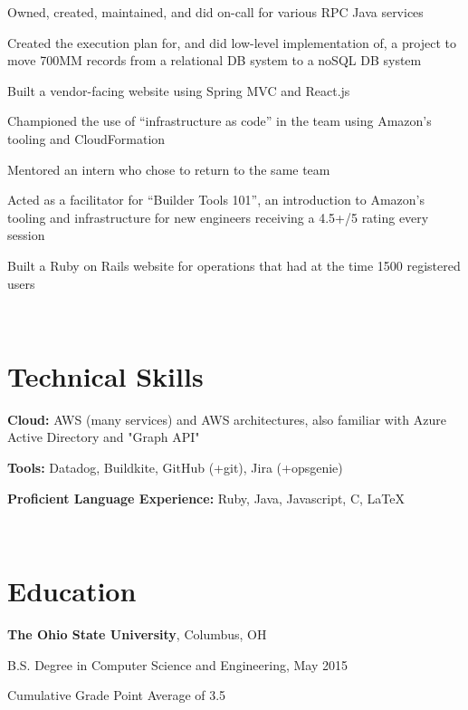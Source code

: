 \documentclass[letterpaper]{resume}
\begin{document}
\begin{compactitem}
\item Owned, created, maintained, and did on-call for various RPC Java services
\item Created the execution plan for, and did low-level implementation of, a
    project to move 700MM records from a relational DB system to a noSQL DB
    system
\item Built a vendor-facing website using Spring MVC and React.js
\item Championed the use of ``infrastructure as code'' in the team using
    Amazon's tooling and CloudFormation
\item Mentored an intern who chose to return to the same team
\item Acted as a facilitator for ``Builder Tools 101'', an introduction to
    Amazon's tooling and infrastructure for new engineers receiving a 4.5+/5 rating every session
\item Built a Ruby on Rails website for operations that had at the time
    1500 registered users
\end{compactitem}

~


\section{Technical Skills}

\begin{compactitem}
\item
	\textbf{Cloud:}
    AWS (many services) and AWS architectures, also familiar with Azure Active
    Directory and "Graph API"

\item
    \textbf{Tools:}
    Datadog, Buildkite, GitHub (+git), Jira (+opsgenie)

\item
	\textbf{Proficient Language Experience:}
    Ruby, Java, Javascript, C, \LaTeX

\end{compactitem}

~

\section{Education}
\textbf{The Ohio State University}, Columbus, OH
\begin{compactitem}
\item B.S. Degree in Computer Science and Engineering, May 2015
\item Cumulative Grade Point Average of 3.5
\end{compactitem}
\end{document}
